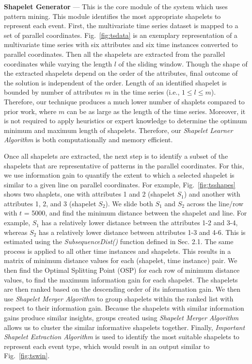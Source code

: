 \documentclass[conference]{IEEEtran}  %
\begin{document}
\textbf{Shapelet Generator}	--- This is the core module of the system which uses pattern mining. This module identifies the most appropriate shapelets to represent each event. First, the multivariate time series dataset is mapped to a set of parallel coordinates. Fig.~\ref{fig:tsdata} is an exemplary representation of a multivariate time series with six attributes and six time instances converted to parallel coordinates. Then all the shapelets are extracted from the parallel coordinates while varying the length $l$ of the sliding window. Though the shape of the extracted shapelets depend on the order of the attributes, final outcome of the solution is independent of the order. Length of an identified shapelet is bounded by number of attributes $m$ in the time series (i.e., $1 \leq l \leq m$). Therefore, our technique produces a much lower number of shaplets compared to prior work, where $m$ can be as large as the length of the time series. Moreover, it is not required to apply heuristics or expert knowledge to determine the optimum minimum and maximum length of shapelets. Therefore, our \textit{Shapelet Learner Algorithm} is both computationally and memory efficient.

Once all shapelets are extracted, the next step is to identify a subset of the shapelets that are representative of patterns in the parallel coordinates. For this, we use information gain to quantify the extent to which a selected shapelet is similar to a given line on parallel coordinates. For example, Fig.~\ref{fig:tsshapes} shows two shaplets, one with attributes 1 and 2 (shapelet $S_1$) and another with attributes 1, 2, and 3 (shapelet $S_2$). We slide both $S_1$ and $S_2$ across the line/row with $t$ = 5000, and find the minimum distance between the shapelet and line. For example, $S_1$ has a relatively lower distance between the attributes 1-2 and 3-4, whereas $S_2$ has a relatively lower distance between attributes 1-3 and 4-6. This is estimated using the \textit{SubsequenceDist()} function defined in Sec. 2.1. The same process is applied to all other time instances and shapelets. This results in a matrix of minimum distance values for each (shapelet, time instance) pair. We then find the Optimal Splitting Point (OSP) \cite{IEEEexample:TimeSeriesShapelets} for each row of minimum distance values, to find the maximum information gain for each shapelet. The shapelets are then ranked based on the descending order of its information gain. We then use \textit{Shapelet Merger Algorithm} to group shapelets within the ranked list with respect to their information gain. Because the shapelets with similar information gains produce similar insights, groups created using \textit{Shapelet Merger Algorithm} allows us to cluster the similar informative shapelets together. Finally, \textit{Important Shapelet Extraction Algorithm} is used to identify the most suitable shapelets to represent each event type, which would result in an output similar to Fig.~\ref{fig:tswin}.
\end{document}
